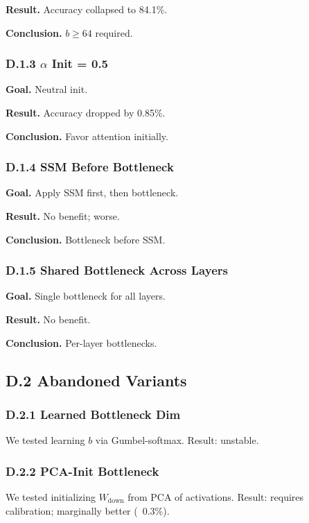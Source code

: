 \textbf{Result.} Accuracy collapsed to 84.1\%.

\textbf{Conclusion.} $b \geq 64$ required.

\subsubsection{D.1.3 $\alpha$ Init = 0.5}

\textbf{Goal.} Neutral init.

\textbf{Result.} Accuracy dropped by 0.85\%.

\textbf{Conclusion.} Favor attention initially.

\subsubsection{D.1.4 SSM Before Bottleneck}

\textbf{Goal.} Apply SSM first, then bottleneck.

\textbf{Result.} No benefit; worse.

\textbf{Conclusion.} Bottleneck before SSM.

\subsubsection{D.1.5 Shared Bottleneck Across Layers}

\textbf{Goal.} Single bottleneck for all layers.

\textbf{Result.} No benefit.

\textbf{Conclusion.} Per-layer bottlenecks.

\subsection{D.2 Abandoned Variants}

\subsubsection{D.2.1 Learned Bottleneck Dim}

We tested learning $b$ via Gumbel-softmax. Result: unstable.

\subsubsection{D.2.2 PCA-Init Bottleneck}

We tested initializing $W_\text{down}$ from PCA of activations. Result: 
requires calibration; marginally better (~0.3\%).

